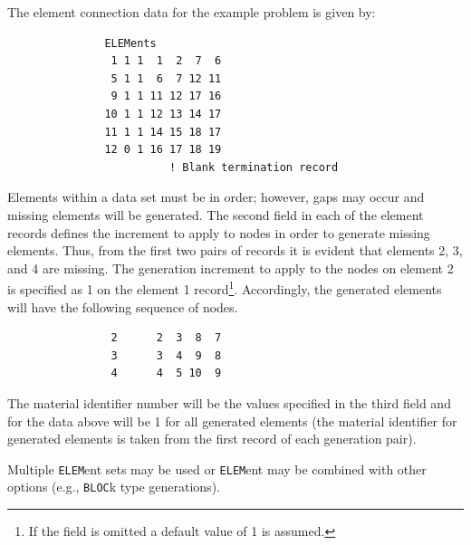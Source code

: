 The element connection data for the example problem is given by:
\begin{verbatim}
               ELEMents
                1 1 1  1  2  7  6
                5 1 1  6  7 12 11
                9 1 1 11 12 17 16
               10 1 1 12 13 14 17
               11 1 1 14 15 18 17
               12 0 1 16 17 18 19
                         ! Blank termination record
\end{verbatim}
Elements within a data set must be in order; however, gaps may occur
and missing elements will be generated.
The second field in each of the element records defines the
increment to apply to nodes in order to generate missing elements.  Thus,
from the first two pairs of records it is evident that elements 2, 3, and 4
are missing.  The generation increment to apply to the nodes on element 2 is
specified as 1 on the element 1 record\footnote{If the field is
omitted a default value of 1 is assumed.}.
Accordingly, the generated elements
will have the following sequence of nodes.
\begin{verbatim}
                2      2  3  8  7
                3      3  4  9  8
                4      4  5 10  9
\end{verbatim}
The material identifier
number will be the values specified in the third field and
for the data above will be 1 for all generated elements (the material
identifier for generated elements
is taken from the first record of each generation pair).

Multiple {\tt ELEM}ent sets may be used or {\tt ELEM}ent may be combined
with other options (e.g., {\tt BLOC}k type generations).

